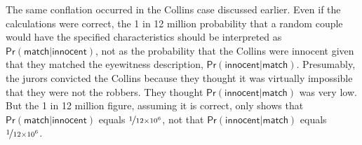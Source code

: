 \documentclass{article}
\newcommand{\pr}{\mathsf{Pr}}
\begin{document}

The same conflation occurred in the Collins case discussed earlier. Even if the calculations were correct, the 1 in 12 million probability that a random couple would have the specified characteristics should be interpreted as 
$\pr(\textsf{match}\vert \textsf{innocent})$, not as the probability that the Collins were innocent given that they matched the eyewitness description, $\pr(\textsf{innocent}\vert \textsf{match})$. Presumably, the jurors convicted the Collins because they thought it was virtually impossible that they were not the robbers. They thought  
$\pr(\textsf{innocent}\vert \textsf{match})$ was very low. 
But the 1 in 12 
million figure, assuming it is correct, only shows that \linebreak  $\pr(\textsf{match}\vert \textsf{innocent})$ equals $\nicefrac{1}{12\times 10^6}$, not that $\pr(\textsf{innocent}\vert \textsf{match})$ equals $\nicefrac{1}{12\times 10^6}$.
\end{document}
